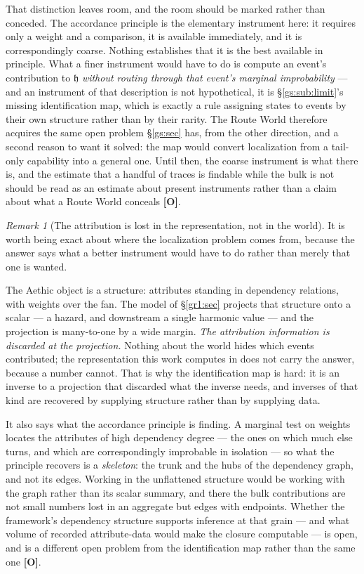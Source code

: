 \documentclass[11pt]{article}
\numberwithin{equation}{section}
\theoremstyle{plain}
\theoremstyle{definition}
\theoremstyle{remark}
\newtheorem{remark}[theorem]{Remark}
\newcommand{\hm}{\mathfrak{h}}
\begin{document}
That distinction leaves room, and the room should be marked rather than
conceded. The accordance principle is the elementary instrument here: it
requires only a weight and a comparison, it is available immediately, and
it is correspondingly coarse. Nothing establishes that it is the best
available in principle. What a finer instrument would have to do is
compute an event's contribution to $\hm$ \emph{without routing through
that event's marginal improbability} --- and an instrument of that
description is not hypothetical, it is
\S\ref{gs:sub:limit}'s missing identification map, which is exactly a
rule assigning states to events by their own structure rather than by
their rarity. The Route World therefore acquires the same open problem
§\ref{gs:sec} has, from the other direction, and a second reason to want
it solved: the map would convert localization from a tail-only
capability into a general one. Until then, the coarse instrument is what
there is, and the estimate that a handful of traces is findable while the
bulk is not should be read as an estimate about present instruments
rather than a claim about what a Route World conceals \textbf{[O]}.

\begin{remark}[The attribution is lost in the representation, not in the
world]\label{gc:rem:flattening}
It is worth being exact about where the localization problem comes from,
because the answer says what a better instrument would have to do rather
than merely that one is wanted.

The Aethic object is a structure: attributes standing in dependency
relations, with weights over the fan. The model of \S\ref{gr1:sec}
projects that structure onto a scalar --- a hazard, and downstream a
single harmonic value --- and the projection is many-to-one by a wide
margin. \emph{The attribution information is discarded at the
projection.} Nothing about the world hides which events contributed;
the representation this work computes in does not carry the answer,
because a number cannot. That is why the identification map is hard: it
is an inverse to a projection that discarded what the inverse needs, and
inverses of that kind are recovered by supplying structure rather than by
supplying data.

It also says what the accordance principle is finding. A marginal test on
weights locates the attributes of high dependency degree --- the ones on
which much else turns, and which are correspondingly improbable in
isolation --- so what the principle recovers is a \emph{skeleton}: the
trunk and the hubs of the dependency graph, and not its edges. Working in
the unflattened structure would be working with the graph rather than its
scalar summary, and there the bulk contributions are not small numbers
lost in an aggregate but edges with endpoints. Whether the framework's
dependency structure supports inference at that grain --- and what
volume of recorded attribute-data would make the closure computable --- is
open, and is a different open problem from the identification map rather
than the same one \textbf{[O]}.
\end{remark}
\end{document}
